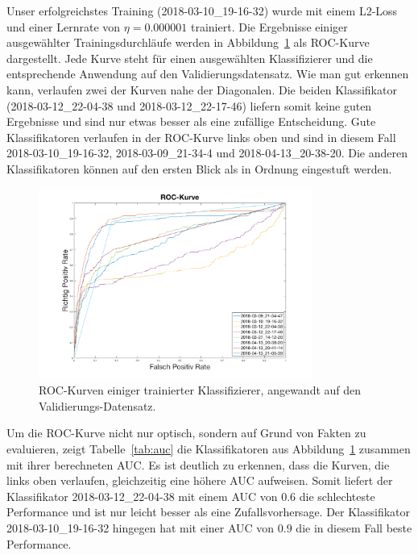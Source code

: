 Unser erfolgreichstes Training (2018-03-10\_19-16-32) wurde mit einem L2-Loss und einer Lernrate von $\eta= 0.000001$ trainiert. Die Ergebnisse einiger ausgewählter Trainingsdurchläufe werden in Abbildung~\ref{fig:roc} als ROC-Kurve dargestellt. Jede Kurve steht für einen ausgewählten Klassifizierer und die entsprechende Anwendung auf den Validierungsdatensatz. Wie man gut erkennen kann, verlaufen zwei der Kurven nahe der Diagonalen. Die beiden Klassifikator (2018-03-12\_22-04-38 und 2018-03-12\_22-17-46) liefern somit keine guten Ergebnisse und sind nur etwas besser als eine zufällige Entscheidung. Gute Klassifikatoren verlaufen in der ROC-Kurve links oben und sind in diesem Fall 2018-03-10\_19-16-32, 2018-03-09\_21-34-4 und 2018-04-13\_20-38-20. Die anderen Klassifikatoren können auf den ersten Blick als in Ordnung eingestuft werden.

\begin{figure}[htb!]
	\begin{center}
		\includegraphics[width=0.8\textwidth]{pics/evaluation/roc_analysis.png}
		\caption{ROC-Kurven einiger trainierter Klassifizierer, angewandt auf den Validierungs-Datensatz.}
		\label{fig:roc}
    \end{center}
\end{figure}

Um die ROC-Kurve nicht nur optisch, sondern auf Grund von Fakten zu evaluieren, zeigt Tabelle~\ref{tab:auc} die Klassifikatoren aus Abbildung~\ref{fig:roc} zusammen mit ihrer berechneten AUC. Es ist deutlich zu erkennen, dass die Kurven, die links oben verlaufen, gleichzeitig eine höhere AUC aufweisen. Somit liefert der Klassifikator 2018-03-12\_22-04-38 mit einem AUC von $0.6$ die schlechteste Performance und ist nur leicht besser als eine Zufallsvorhersage. Der Klassifikator 2018-03-10\_19-16-32 hingegen hat mit einer AUC von $0.9$ die in diesem Fall beste Performance. 

